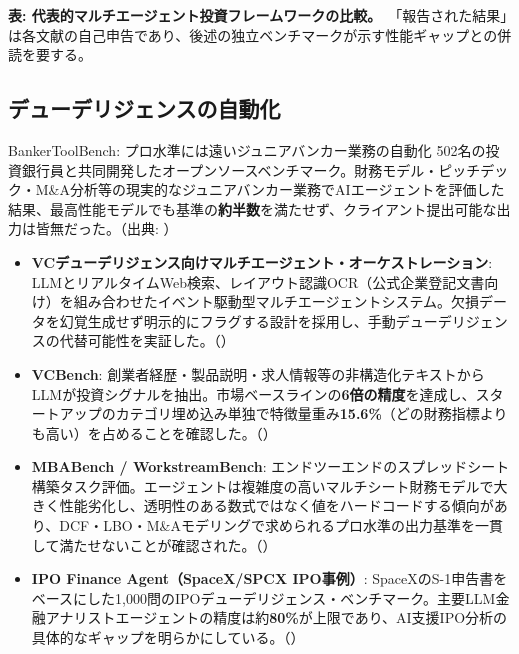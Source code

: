 \vspace{-1mm}
{\small\color{figgray}\textbf{表: 代表的マルチエージェント投資フレームワークの比較。}\
「報告された結果」は各文献の自己申告であり、後述の独立ベンチマークが示す性能ギャップとの併読を要する。}

\subsection{デューデリジェンスの自動化}

\begin{casestudy}{BankerToolBench: プロ水準には遠いジュニアバンカー業務の自動化}
502名の投資銀行員と共同開発したオープンソースベンチマーク。財務モデル・ピッチデック・M\&A分析等の現実的なジュニアバンカー業務でAIエージェントを評価した結果、最高性能モデルでも基準の\textbf{約半数}を満たせず、クライアント提出可能な出力は皆無だった。（出典: \cite{bankertoolbench2026}）
\end{casestudy}

\begin{itemize}
  \item \textbf{VCデューデリジェンス向けマルチエージェント・オーケストレーション}: LLMとリアルタイムWeb検索、レイアウト認識OCR（公式企業登記文書向け）を組み合わせたイベント駆動型マルチエージェントシステム。欠損データを幻覚生成せず明示的にフラグする設計を採用し、手動デューデリジェンスの代替可能性を実証した。（\cite{vcduediligence2026}）
  \item \textbf{VCBench}: 創業者経歴・製品説明・求人情報等の非構造化テキストからLLMが投資シグナルを抽出。市場ベースラインの\textbf{6倍の精度}を達成し、スタートアップのカテゴリ埋め込み単独で特徴量重み\textbf{15.6\%}（どの財務指標よりも高い）を占めることを確認した。（\cite{vcbench2025}）
  \item \textbf{MBABench / WorkstreamBench}: エンドツーエンドのスプレッドシート構築タスク評価。エージェントは複雑度の高いマルチシート財務モデルで大きく性能劣化し、透明性のある数式ではなく値をハードコードする傾向があり、DCF・LBO・M\&Aモデリングで求められるプロ水準の出力基準を一貫して満たせないことが確認された。（\cite{workstreambench2026}）
  \item \textbf{IPO Finance Agent（SpaceX/SPCX IPO事例）}: SpaceXのS-1申告書をベースにした1,000問のIPOデューデリジェンス・ベンチマーク。主要LLM金融アナリストエージェントの精度は約\textbf{80\%}が上限であり、AI支援IPO分析の具体的なギャップを明らかにしている。（\cite{ipofinanceagent2026}）
\end{itemize}

